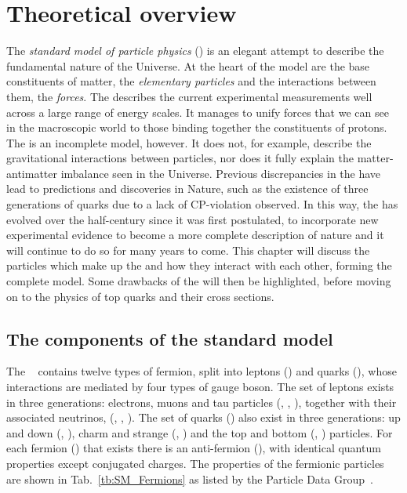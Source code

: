 \chapter{Theoretical overview}
\label{ch:Theory}

The \textit{standard model of particle physics} (\SM{}) is an elegant attempt to describe the fundamental nature of the Universe.
At the heart of the model are the base constituents of matter, the \textit{elementary particles} and the interactions between them, the \textit{forces}.
The \SM{} describes the current experimental measurements well across a large range of energy scales.
It manages to unify forces that we can see in the macroscopic world to those binding together the constituents of protons.
The \SM{} is an incomplete model, however. 
It does not, for example, describe the gravitational interactions between particles, nor does it fully explain the matter-antimatter imbalance seen in the Universe.
Previous discrepancies in the \SM{} have lead to predictions and discoveries in Nature, such as the existence of three generations of quarks due to a lack of CP-violation observed. 
In this way, the \SM{} has evolved over the half-century since it was first postulated, to incorporate new experimental evidence to become a more complete description of nature and it will continue to do so for many years to come.
This chapter will discuss the particles which make up the \SM{} and how they interact with each other, forming the complete model.
Some drawbacks of the \SM{} will then be highlighted, before moving on to the physics of top quarks and their cross sections.

\section{The components of the standard model}
\label{sec:SM}

The \SM{}~\cite{Th:SM1, Th:SM2, Th:SM3, Th:SM4, Th:SM5} contains twelve types of fermion, split into leptons (\lepton{}) and quarks (\quark{}), whose interactions are mediated by four types of gauge boson.
The set of leptons exists in three generations: electrons, muons and tau particles (\electron{}, \muon{}, \tauon{}), together with their associated neutrinos, (\nue{}, \numu{}, \nutau{}). 
The set of quarks (\quark{}) also exist in three generations: up and down (\uquark{}, \dquark{}), charm and strange (\cquark{}, \squark{}) and the top and bottom (\tquark{}, \bquark{}) particles. 
For each fermion (\fermion{}) that exists there is an anti-fermion (\antifermion{}), with identical quantum properties except conjugated charges.
The properties of the fermionic particles are shown in Tab.~\ref{tb:SM_Fermions} as listed by the Particle Data Group~\cite{PDG}.


